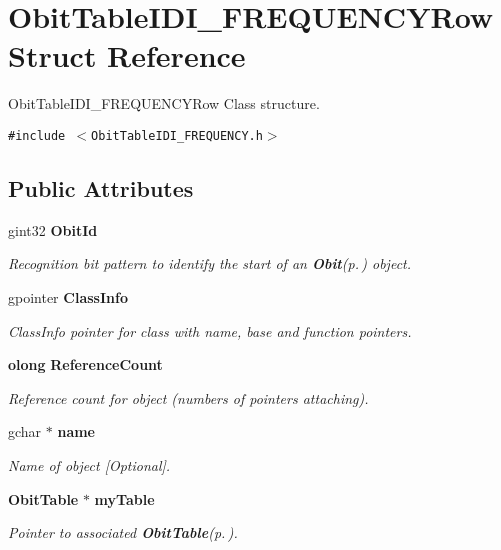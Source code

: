 \section{Obit\-Table\-IDI\_\-FREQUENCYRow Struct Reference}
\label{structObitTableIDI__FREQUENCYRow}
Obit\-Table\-IDI\_\-FREQUENCYRow Class structure.  


{\tt \#include $<$Obit\-Table\-IDI\_\-FREQUENCY.h$>$}

\subsection*{Public Attributes}
\begin{CompactItemize}
\item 
gint32 {\bf Obit\-Id}
\begin{CompactList}\small\item\em Recognition bit pattern to identify the start of an {\bf Obit}{\rm (p.\,\pageref{structObit})} object. \item\end{CompactList}\item 
gpointer {\bf Class\-Info}
\begin{CompactList}\small\item\em Class\-Info pointer for class with name, base and function pointers. \item\end{CompactList}\item 
{\bf olong} {\bf Reference\-Count}
\begin{CompactList}\small\item\em Reference count for object (numbers of pointers attaching). \item\end{CompactList}\item 
gchar $\ast$ {\bf name}
\begin{CompactList}\small\item\em Name of object [Optional]. \item\end{CompactList}\item 
{\bf Obit\-Table} $\ast$ {\bf my\-Table}
\begin{CompactList}\small\item\em Pointer to associated {\bf Obit\-Table}{\rm (p.\,\pageref{structObitTable})}. \item\end{CompactList}\item 

\end{CompactItemize}
